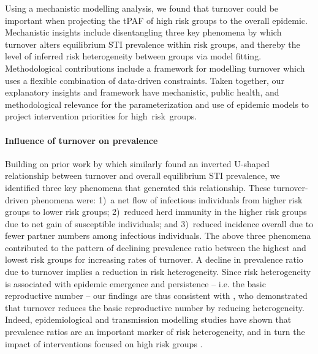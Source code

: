 Using a mechanistic modelling analysis,
we found that turnover could be important when
projecting the tPAF of high risk groups to the overall epidemic.
Mechanistic insights include disentangling
three key phenomena by which turnover
alters equilibrium STI prevalence within risk groups,
and thereby the level of inferred risk heterogeneity between groups via model fitting.
Methodological contributions include a  framework for modelling turnover
which uses a flexible combination of data-driven constraints.
Taken together, our explanatory insights and framework
have mechanistic, public health, and methodological relevance for
the parameterization and use of epidemic models
to project intervention priorities for high~risk~groups. %
\paragraph{Influence of turnover on prevalence}
Building on prior work by \citet{Stigum1994,Zhang2012,Henry2015}
which similarly found an inverted U-shaped relationship between
turnover and overall equilibrium STI prevalence,
we identified three key phenomena that generated this relationship.
These turnover-driven phenomena were:
1)~a net flow of infectious individuals from higher risk groups to lower risk groups;
2)~reduced herd immunity in the higher risk groups due to net gain of susceptible individuals; and
3)~reduced incidence overall due to fewer partner numbers among infectious individuals.
The above three phenomena contributed to the pattern
of declining prevalence ratio between the highest and lowest risk groups
for increasing rates of turnover.
A decline in prevalence ratio due to turnover implies a reduction in risk heterogeneity.
Since risk heterogeneity is associated with epidemic emergence and persistence \citep{May1988}
-- i.e. the basic reproductive number --
our findings are thus consistent with \citet{Henry2015},
who demonstrated that turnover reduces the basic reproductive number by reducing heterogeneity.
Indeed, epidemiological and transmission modelling studies have shown that prevalence ratios
are an important marker of risk heterogeneity, and in turn
the impact of interventions focused on high risk groups \citep{Baral2012,Mishra2012}.
